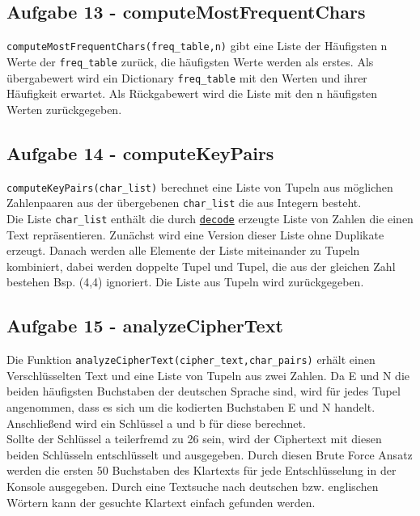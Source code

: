 \documentclass[12pt]{article}
\begin{document}
		\subsection{\label{ssec:Aufgabe13}Aufgabe 13 - computeMostFrequentChars}
		\texttt{computeMostFrequentChars(freq\_table,n)} gibt eine Liste der H\"aufigsten n Werte der \texttt{freq\_table}
zur\"uck, die h\"aufigsten Werte werden als erstes. 
Als \"ubergabewert wird ein Dictionary \texttt{freq\_table} mit den Werten und ihrer H\"aufigkeit erwartet. 
Als R\"uckgabewert wird die Liste mit den n h\"aufigsten Werten zur\"uckgegeben.
			
			
		\subsection{\label{ssec:Aufgabe14}Aufgabe 14 - computeKeyPairs}
			\texttt{computeKeyPairs(char\_list)} berechnet eine Liste von Tupeln aus m\"oglichen Zahlenpaaren aus der \"ubergebenen \texttt{char\_list} die aus Integern besteht.\\
Die Liste \texttt{char\_list} enth\"alt die durch \hyperref[ssec:Aufgabe1]{\texttt{decode}} erzeugte Liste von Zahlen die einen Text repr\"asentieren.
Zun\"achst wird eine Version dieser Liste ohne Duplikate erzeugt. Danach werden alle Elemente der Liste miteinander zu Tupeln kombiniert, dabei werden doppelte Tupel und Tupel, die 
aus der gleichen Zahl bestehen Bsp. (4,4) ignoriert.
Die Liste aus Tupeln wird zur\"uckgegeben.\\
			
			
		\subsection{\label{ssec:Aufgabe15}Aufgabe 15 - analyzeCipherText}
			Die Funktion \texttt{analyzeCipherText(cipher\_text,char\_pairs)} erh\"alt einen Verschl\"usselten Text und eine Liste von Tupeln aus zwei Zahlen. 
Da E und N die beiden h\"aufigsten Buchstaben der deutschen Sprache sind, wird f\"ur jedes Tupel angenommen, dass es sich um die kodierten Buchstaben E und N handelt.
Anschlie{\ss}end wird ein Schl\"ussel a und b f\"ur diese berechnet.\\ Sollte der Schl\"ussel a teilerfremd zu 26 sein, wird der Ciphertext mit diesen beiden Schl\"usseln entschl\"usselt und ausgegeben.
Durch diesen Brute Force Ansatz werden die ersten 50 Buchstaben des Klartexts f\"ur jede Entschl\"usselung in der Konsole ausgegeben. Durch eine Textsuche nach deutschen bzw. englischen W\"ortern kann der gesuchte Klartext einfach gefunden werden.\\
			
		
\end{document}
